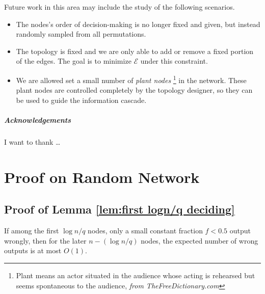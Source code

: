 \documentclass[a4paper,UKenglish]{lipics}
\theoremstyle{definition}
\begin{document}
Future work in this area may include the study of the following scenarios.
\begin{itemize}
\item The nodes's order of decision-making is no longer fixed and given, but instead randomly sampled from all permutations.
\item The topology is fixed and we are only able to add or remove a fixed portion of the edges.
		The goal is to minimize $\mathcal{E}$ under this constraint.
\item We are allowed set a small number of \emph{plant nodes}
	\footnote{Plant means an actor situated in the audience whose acting is rehearsed but seems spontaneous to the audience, 
	\emph{from TheFreeDictionary.com}} in the network.
	These plant nodes are controlled completely by the topology designer, so they can be used to guide the information cascade.
\end{itemize}









\subparagraph*{Acknowledgements}

I want to thank \dots









\clearpage
\appendix
\section{Proof on Random Network}

\subsection{Proof of Lemma \ref{lem:first logn/q deciding}}
\label{subsec:first logn/q deciding}
If among the first $\log n/q$ nodes, 
	only a small constant fraction $f < 0.5$ output wrongly, 
	then for the later $n - (\log n/q)$ nodes, the expected number of wrong outputs is at most $O(1)$.
\end{document}
